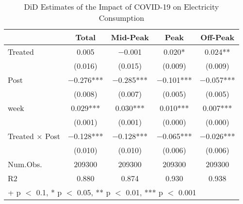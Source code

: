 \begin{table}
\centering
\caption{DiD Estimates of the Impact of COVID-19 on Electricity Consumption \label{tab:did_results}}
\centering
\begin{tabular*}{\textwidth}{@{\extracolsep{\fill}}lcccc}
\toprule
  & Total & Mid-Peak & Peak & Off-Peak\\
\midrule
Treated & \num{0.005} & \num{-0.001} & \num{0.020}* & \num{0.024}**\\
 & (\num{0.016}) & (\num{0.015}) & (\num{0.009}) & (\num{0.009})\\
Post & \num{-0.276}*** & \num{-0.285}*** & \num{-0.101}*** & \num{-0.057}***\\
 & (\num{0.008}) & (\num{0.007}) & (\num{0.005}) & (\num{0.005})\\
week & \num{0.029}*** & \num{0.030}*** & \num{0.010}*** & \num{0.007}***\\
 & (\num{0.001}) & (\num{0.001}) & (\num{0.000}) & (\num{0.000})\\
Treated × Post & \num{-0.128}*** & \num{-0.128}*** & \num{-0.065}*** & \num{-0.026}***\\
 & (\num{0.010}) & (\num{0.010}) & (\num{0.006}) & (\num{0.006})\\
\midrule
Num.Obs. & \num{209300} & \num{209300} & \num{209300} & \num{209300}\\
R2 & \num{0.880} & \num{0.874} & \num{0.930} & \num{0.938}\\
\bottomrule
\multicolumn{5}{l}{\rule{0pt}{1em}+ p $<$ 0.1, * p $<$ 0.05, ** p $<$ 0.01, *** p $<$ 0.001}\\
\end{tabular*}
\end{table}